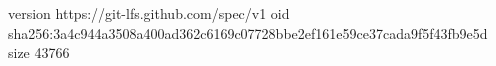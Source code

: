 version https://git-lfs.github.com/spec/v1
oid sha256:3a4c944a3508a400ad362c6169c07728bbe2ef161e59ce37cada9f5f43fb9e5d
size 43766
